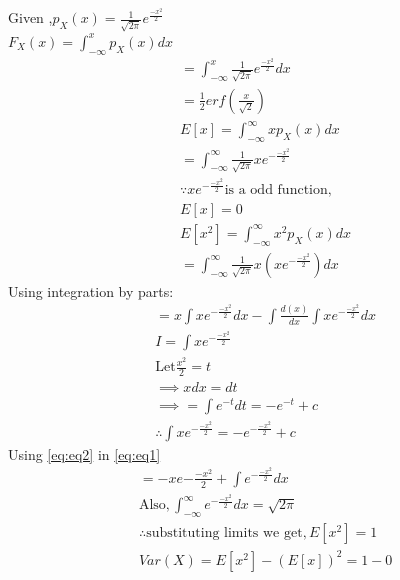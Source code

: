 \documentclass[journal,12pt,twocolumn]{IEEEtran}
\begin{document}
\\
Given ,$p_{X}(x)=\frac{1}{\sqrt{2\pi}} e^{\frac{-x^2}{2}}$\\
 $F_{X}(x)=\int_{-\infty}^{x} p_{X}(x) dx$\\
 \begin{align}
  &=\int_{-\infty}^{x} \frac{1}{\sqrt{2\pi}} e^{\frac{-x^2}{2}} dx\\
 &=\frac{1}{2} erf\left(\frac{x}{\sqrt{2}}\right)\\
 &E[x]=\int_{-\infty}^{\infty} x p_{X}(x) dx\\
 &=\int_{-\infty}^{\infty} \frac{1}{\sqrt{2 \pi}} x e^{-\frac{-x^2}{2}}\\
  &\because x e^{-\frac{-x^2}{2}} \text{is a odd function},\\
  \nonumber
   &E[x]=0\\
 &E[x^2]=\int_{-\infty}^{\infty} x^2 p_{X}(x) dx\\
 &=\int_{-\infty}^{\infty} \frac{1}{\sqrt{2\pi}} x(xe^{-\frac{-x^2}{2}}) dx
 \end{align}
  Using integration by parts:
  \begin{align}
   \label{eq:eq1}
 & =x\int xe^{-\frac{-x^2}{2}} dx-\int\frac{d(x)}{dx} \int xe^{-\frac{-x^2}{2}}dx\\
 &I=\int x e^{-\frac{-x^2}{2}}\\
 &\text{Let} \frac{x^2}{2}=t \\
 &\implies x dx=dt\\
 &\implies =\int e^{-t} dt=-e^{-t} +c\\
 \label{eq:eq2}
 &\therefore \int x e^{-\frac{-x^2}{2}}=-e^{-\frac{-x^2}{2}} +c
 \end{align}
 Using \eqref{eq:eq2} in \eqref{eq:eq1}\\
 \begin{align}
&= -x e{-\frac{-x^2}{2}}+\int e^{-\frac{-x^2}{2}} dx\\
&\text{Also} ,\int_{-\infty}^{\infty} e^{-\frac{-x^2}{2}} dx=\sqrt{2 \pi} \\
&\therefore \text{substituting limits we get}, E[x^2]=1\\
 &Var(X)=E[x^2]-(E[x])^2=1-0
 \end{align}
\end{document}
